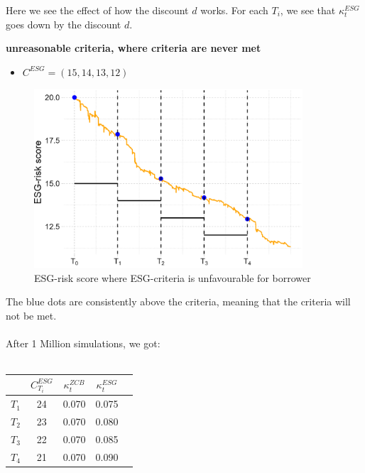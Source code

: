 Here we see the effect of how the discount $d$ works. For each $T_{i}$, we see that $\kappa_{t}^{ESG}$ goes down by the discount $d$. 

\newpage 
\textbf{unreasonable criteria, where criteria are never met}
\begin{itemize}
    \item $C^{ESG} = (15, 14, 13, 12)$
\end{itemize}

\begin{figure}[htp]
    \centering
    \includegraphics[width= 10cm]{figures/ESG/ESG_plt_criteria3.png}
    \caption{ESG-risk score where ESG-criteria is unfavourable for borrower}
    \label{fig: ESG_risk_criteria_3}
\end{figure} 

The blue dots are consistently above the criteria, meaning that the criteria will not be met. 
\\~\\ 
After 1 Million simulations, we got:
\\~\\
\begin{center}
\begin{tabular}{lcccl}
\toprule
           &$C_{T_{i}}^{ESG}$ & $\kappa_{t}^{ZCB}$  & $\kappa_{t}^{ESG}$ \\
\midrule
$T_{1}$ &  24 & 0.070 & 0.075 \\
$T_{2}$ &  23 & 0.070 & 0.080 \\
$T_{3}$ &  22 & 0.070 & 0.085 \\
$T_{4}$ &  21 & 0.070 & 0.090 \\
\bottomrule
\end{tabular}
\end{center}

